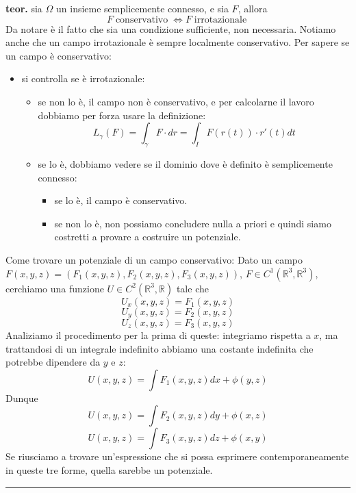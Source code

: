 \newline
\textbf{teor.} sia $\Omega$ un insieme semplicemente connesso, e sia $F$, allora
\[
    F \; \text{conservativo}\; \Longleftrightarrow F \; \text{irrotazionale}\;
\]
Da notare è il fatto che sia una condizione sufficiente, non necessaria.\newline
Notiamo anche che un campo irrotazionale è sempre localmente conservativo.\newline
\newline
Per sapere se un campo è conservativo:
\begin{itemize}
    \item si controlla se è irrotazionale:
    \begin{itemize}
        \item se non lo è, il campo non è conservativo, e per calcolarne il lavoro dobbiamo per forza usare la definizione:
        \[
            L_\gamma (F) = \int_{\gamma} F \cdot dr = \int_{I} F(r(t))\cdot r'(t) dt
        \]
        \item se lo è, dobbiamo vedere se il dominio dove è definito è semplicemente connesso:
        \begin{itemize}
            \item se lo è, il campo è conservativo.
            \item se non lo è, non possiamo concludere nulla a priori e quindi siamo costretti a provare a costruire un potenziale.
        \end{itemize}
    \end{itemize}
\end{itemize}
Come trovare un potenziale di un campo conservativo:\newline
Dato un campo $F(x,y,z) = (F_1(x,y,z), F_2(x,y,z), F_3(x,y,z))$, $F \in C^1(\mathbb{R}^3, \mathbb{R}^3)$, cerchiamo una funzione $U \in C^2(\mathbb{R}^3, \mathbb{R})$ tale che
\[
    U_x(x,y,z) = F_1(x,y,z)
\]
\[
    U_y(x,y,z) = F_2(x,y,z)
\]
\[
    U_z(x,y,z) = F_3(x,y,z)
\]
Analiziamo il procedimento per la prima di queste: integriamo rispetta a $x$, ma trattandosi di un integrale indefinito abbiamo una costante indefinita che potrebbe dipendere da $y$ e $z$:
\[
    U(x,y,z) = \int F_1(x,y,z)dx + \phi(y,z)
\]
Dunque
\[
    U(x,y,z) = \int F_2(x,y,z)dy + \phi(x,z)
\]
\[
    U(x,y,z) = \int F_3(x,y,z)dz + \phi(x,y)
\]
Se riusciamo a trovare un'espressione che si possa esprimere contemporaneamente in queste tre forme, quella sarebbe un potenziale.\newline
\rule{\textwidth}{0,4pt}
